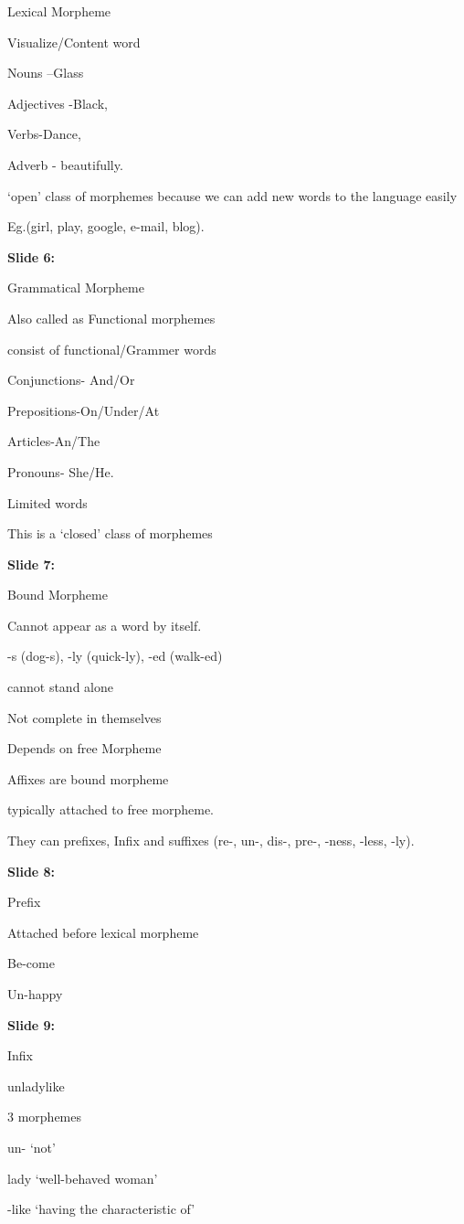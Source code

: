 \documentclass[11pt,a4paper]{article}
\begin{document}
Lexical  Morpheme

Visualize/Content word

Nouns –Glass

Adjectives -Black,

Verbs-Dance,

Adverb - beautifully.

‘open' class of morphemes because we can add new words to the language easily

Eg.(girl, play, google, e-mail, blog).

\textbf{Slide 6:}

Grammatical Morpheme

Also called as Functional morphemes

consist of functional/Grammer words

Conjunctions- And/Or

Prepositions-On/Under/At

Articles-An/The

Pronouns- She/He.

Limited words

This is a ‘closed' class of morphemes

\textbf{Slide 7:}

Bound  Morpheme

Cannot appear as a word by itself.

-s (dog-s), -ly (quick-ly), -ed (walk-ed)

cannot stand alone

Not complete in themselves

Depends on free Morpheme

Affixes are bound morpheme

typically attached to free morpheme.

They can prefixes, Infix and suffixes (re-, un-, dis-, pre-, -ness, -less, -ly).

\textbf{Slide 8:}

Prefix

Attached before lexical morpheme

Be-come

Un-happy

\textbf{Slide 9:}

Infix

unladylike

3 morphemes

un- ‘not’

lady ‘well-behaved woman’

-like ‘having the characteristic of’
\end{document}
